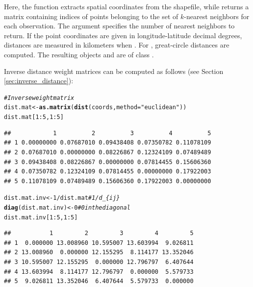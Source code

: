 \documentclass[english,12pt]{book}\usepackage[]{graphicx}\usepackage[]{xcolor}
\makeatletter
\newcommand{\hlnum}[1]{\textcolor[rgb]{0.686,0.059,0.569}{#1}}%
\newcommand{\hlsng}[1]{\textcolor[rgb]{0.192,0.494,0.8}{#1}}%
\newcommand{\hlcom}[1]{\textcolor[rgb]{0.678,0.584,0.686}{\textit{#1}}}%
\newcommand{\hlopt}[1]{\textcolor[rgb]{0,0,0}{#1}}%
\newcommand{\hldef}[1]{\textcolor[rgb]{0.345,0.345,0.345}{#1}}%
\newcommand{\hlkwb}[1]{\textcolor[rgb]{0.69,0.353,0.396}{#1}}%
\newcommand{\hlkwc}[1]{\textcolor[rgb]{0.333,0.667,0.333}{#1}}%
\newcommand{\hlkwd}[1]{\textcolor[rgb]{0.737,0.353,0.396}{\textbf{#1}}}%
\newenvironment{kframe}{%
 \def\at@end@of@kframe{}%
 \ifinner\ifhmode%
  \def\at@end@of@kframe{\end{minipage}}%
  \begin{minipage}{\columnwidth}%
 \fi\fi%
 \def\FrameCommand##1{\hskip\@totalleftmargin \hskip-\fboxsep
 \colorbox{shadecolor}{##1}\hskip-\fboxsep
     \hskip-\linewidth \hskip-\@totalleftmargin \hskip\columnwidth}%
 \MakeFramed {\advance\hsize-\width
   \@totalleftmargin\z@ \linewidth\hsize
   \@setminipage}}%
 {\par\unskip\endMakeFramed%
 \at@end@of@kframe}
\newenvironment{knitrout}{}{} %
\makeatother
\begin{document}
Here, the  function extracts spatial coordinates from the shapefile, while  returns a matrix containing indices of points belonging to the set of $k$-nearest neighbors for each observation. The  argument specifies the number of nearest neighbors to return. If the point coordinates are given in longitude-latitude decimal degrees, distances are measured in kilometers when . For , great-circle distances are computed. The resulting objects  and  are of class .

Inverse distance weight matrices can be computed as follows (see Section \ref{sec:inverse_distance}):

\begin{knitrout}
\color{fgcolor}\begin{kframe}
\begin{alltt}
\hlcom{# Inverse weight matrix}
\hldef{dist.mat} \hlkwb{<-} \hlkwd{as.matrix}\hldef{(}\hlkwd{dist}\hldef{(coords,} \hlkwc{method} \hldef{=} \hlsng{"euclidean"}\hldef{))}
\hldef{dist.mat[}\hlnum{1}\hlopt{:}\hlnum{5}\hldef{,} \hlnum{1}\hlopt{:}\hlnum{5}\hldef{]}
\end{alltt}
\begin{verbatim}
##            1          2          3          4          5
## 1 0.00000000 0.07687010 0.09438408 0.07350782 0.11078109
## 2 0.07687010 0.00000000 0.08226867 0.12324109 0.07489489
## 3 0.09438408 0.08226867 0.00000000 0.07814455 0.15606360
## 4 0.07350782 0.12324109 0.07814455 0.00000000 0.17922003
## 5 0.11078109 0.07489489 0.15606360 0.17922003 0.00000000
\end{verbatim}
\begin{alltt}
\hldef{dist.mat.inv} \hlkwb{<-} \hlnum{1} \hlopt{/} \hldef{dist.mat} \hlcom{# 1 / d_\{ij\}}
\hlkwd{diag}\hldef{(dist.mat.inv)} \hlkwb{<-} \hlnum{0}      \hlcom{# 0 in the diagonal}
\hldef{dist.mat.inv[}\hlnum{1}\hlopt{:}\hlnum{5}\hldef{,} \hlnum{1}\hlopt{:}\hlnum{5}\hldef{]}
\end{alltt}
\begin{verbatim}
##           1         2         3         4         5
## 1  0.000000 13.008960 10.595007 13.603994  9.026811
## 2 13.008960  0.000000 12.155295  8.114177 13.352046
## 3 10.595007 12.155295  0.000000 12.796797  6.407644
## 4 13.603994  8.114177 12.796797  0.000000  5.579733
## 5  9.026811 13.352046  6.407644  5.579733  0.000000
\end{verbatim}

\end{kframe}
\end{knitrout}
\end{document}
